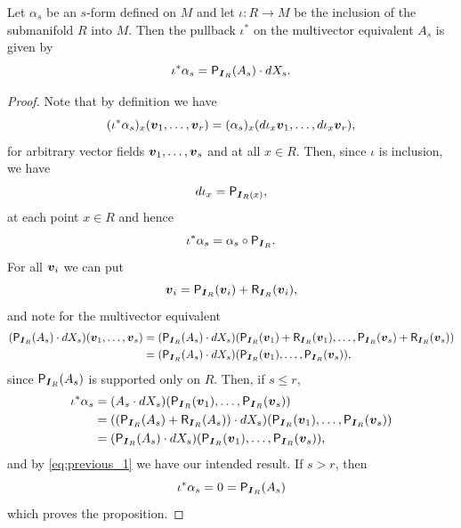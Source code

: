 \documentclass{article}
\begin{document}
\begin{proposition}
Let $\alpha_s$ be an $s$-form defined on $M$ and let $\iota \colon R \to M$ be the inclusion of the submanifold $R$ into $M$. Then the pullback $\iota^*$ on the multivector equivalent $A_s$ is given by
\begin{equation}
\iota^* \alpha_s = \mathsf{P}_{\boldsymbol{I}_R}(A_s) \cdot dX_s.
\end{equation}
\end{proposition}
\begin{proof}
Note that by definition we have
\[
(\iota^* \alpha_s)_x (\boldsymbol{v}_1,\dots,\boldsymbol{v}_r) = (\alpha_s)_x(d\iota_x\boldsymbol{v}_1,\dots, d\iota_x\boldsymbol{v}_r ),
\]
for arbitrary vector fields $\boldsymbol{v}_1,\dots,\boldsymbol{v}_s$ and at all $x\in R$. Then, since $\iota$ is inclusion, we have
\[
d\iota_x = \mathsf{P}_{\boldsymbol{I}_R(x)},
\]
at each point $x \in R$ and hence
\[
\iota^* \alpha_s = \alpha_s \circ \mathsf{P}_{\boldsymbol{I}_R}.
\]
For all $\boldsymbol{v}_i$ we can put
\[
\boldsymbol{v}_i = \mathsf{P}_{\boldsymbol{I}_R}(\boldsymbol{v}_i) + \mathsf{R}_{\boldsymbol{I}_R}(\boldsymbol{v}_i),
\]
and note for the multivector equivalent
\begin{align}
\label{eq:previous_1}
(\mathsf{P}_{\boldsymbol{I}_R}(A_s) \cdot dX_s)(\boldsymbol{v}_1,\dots,\boldsymbol{v}_s) &= (\mathsf{P}_{\boldsymbol{I}_R}(A_s) \cdot dX_s)(\mathsf{P}_{\boldsymbol{I}_R}(\boldsymbol{v}_1) + \mathsf{R}_{\boldsymbol{I}_R}(\boldsymbol{v}_1),\dots,\mathsf{P}_{\boldsymbol{I}_R}(\boldsymbol{v}_s) + \mathsf{R}_{\boldsymbol{I}_R}(\boldsymbol{v}_s))\\
&= (\mathsf{P}_{\boldsymbol{I}_R}(A_s) \cdot dX_s)(\mathsf{P}_{\boldsymbol{I}_R}(\boldsymbol{v}_1),\dots,\mathsf{P}_{\boldsymbol{I}_R}(\boldsymbol{v}_s)),
\end{align}
since $\mathsf{P}_{\boldsymbol{I}_R}(A_s)$ is supported only on $R$. Then, if $s\leq r$,
\begin{align*}
\iota^*\alpha_s &= (A_s \cdot dX_s)(\mathsf{P}_{\boldsymbol{I}_R}(\boldsymbol{v}_1),\dots,\mathsf{P}_{\boldsymbol{I}_R}(\boldsymbol{v}_s))\\
&= ((\mathsf{P}_{\boldsymbol{I}_R}(A_s) + \mathsf{R}_{\boldsymbol{I}_R}(A_s)) \cdot dX_s)(\mathsf{P}_{\boldsymbol{I}_R}(\boldsymbol{v}_1),\dots,\mathsf{P}_{\boldsymbol{I}_R}(\boldsymbol{v}_s))\\
&= (\mathsf{P}_{\boldsymbol{I}_R}(A_s) \cdot dX_s)(\mathsf{P}_{\boldsymbol{I}_R}(\boldsymbol{v}_1),\dots,\mathsf{P}_{\boldsymbol{I}_R}(\boldsymbol{v}_s)),
\end{align*}
and by \cref{eq:previous_1} we have our intended result. If $s>r$, then 
\[
\iota^* \alpha_s = 0 = \mathsf{P}_{\boldsymbol{I}_R}(A_s)
\]
which proves the proposition.
\end{proof}
\end{document}
